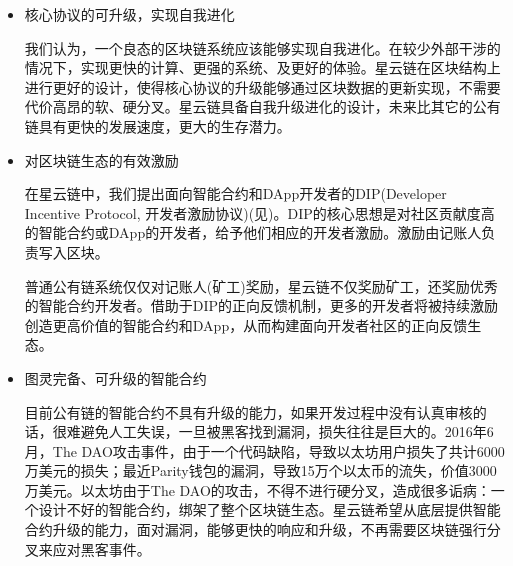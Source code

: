 \begin{itemize}
	\item 核心协议的可升级，实现自我进化

我们认为，一个良态的区块链系统应该能够实现自我进化。在较少外部干涉的情况下，实现更快的计算、更强的系统、及更好的体验。星云链在区块结构上进行更好的设计，使得核心协议的升级能够通过区块数据的更新实现，不需要代价高昂的软、硬分叉。星云链具备自我升级进化的设计，未来比其它的公有链具有更快的发展速度，更大的生存潜力。

	\item 对区块链生态的有效激励

在星云链中，我们提出面向智能合约和DApp开发者的DIP(Developer Incentive Protocol, 开发者激励协议)(见)。DIP的核心思想是对社区贡献度高的智能合约或DApp的开发者，给予他们相应的开发者激励。激励由记账人负责写入区块。

普通公有链系统仅仅对记账人(矿工)奖励，星云链不仅奖励矿工，还奖励优秀的智能合约开发者。借助于DIP的正向反馈机制，更多的开发者将被持续激励创造更高价值的智能合约和DApp，从而构建面向开发者社区的正向反馈生态。

	\item 图灵完备、可升级的智能合约

目前公有链的智能合约不具有升级的能力，如果开发过程中没有认真审核的话，很难避免人工失误，一旦被黑客找到漏洞，损失往往是巨大的。2016年6月，The DAO攻击事件，由于一个代码缺陷，导致以太坊用户损失了共计6000万美元的损失；最近Parity钱包的漏洞，导致15万个以太币的流失，价值3000万美元。以太坊由于The DAO的攻击，不得不进行硬分叉，造成很多诟病：一个设计不好的智能合约，绑架了整个区块链生态。星云链希望从底层提供智能合约升级的能力，面对漏洞，能够更快的响应和升级，不再需要区块链强行分叉来应对黑客事件。

\end{itemize}

